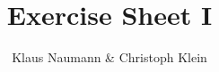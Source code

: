 \documentclass[DIV=12,oneside,a4paper]{scrartcl}
\begin{document}

\title{Exercise Sheet I}
\subject{Advanced Parallel Computing}
\author{Klaus Naumann \& Christoph Klein}
\maketitle


\end{document}
